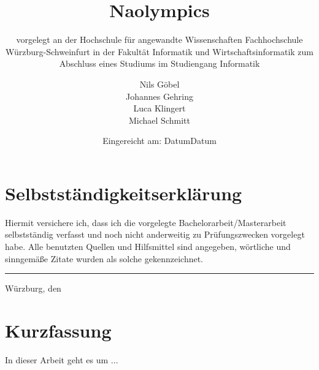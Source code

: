 \documentclass[12pt,a4paper,DIV13,pdftex,BCOR10mm,fleqn,liststotoc,bibtotoc,cleardoubleempty]{scrbook}
\begin{document}
\frontmatter
\titlehead{%
  {Hochschule f\"{u}r angewandte Wissenschaften\\
   Fachhochschule W\"{u}rzburg-Schweinfurt\\
   Fakult\"{a}t Informatik und Wirtschaftsinformatik}}
\subject{Projektarbeit}
\title{Naolympics\\[10mm]}
\subtitle{\normalsize{vorgelegt an der Hochschule f\"{u}r angewandte Wissenschaften Fachhochschule W\"{u}rzburg-Schweinfurt in der Fakult\"{a}t Informatik und Wirtschaftsinformatik zum Abschluss eines Studiums im Studiengang Informatik}}
\author{Nils G\"obel\\Johannes Gehring\\Luca Klingert\\Michael Schmitt}
\date{\normalsize{Eingereicht am: Datum}}
\publishers{
  \normalsize{Erstpr\"{u}fer: Prof. Dr. Arndt Balzer} \\
  \normalsize{Zweitpr\"{u}fer: Prof. Dr. Daniel Kulesz}\\
}


\maketitle

\thispagestyle{empty}
\section*{Selbstst\"{a}ndigkeitserkl\"{a}rung}
Hiermit versichere ich, dass ich die vorgelegte Bachelorarbeit/Masterarbeit selbstst\"{a}ndig verfasst und noch nicht anderweitig zu Pr\"{u}fungszwecken vorgelegt habe. Alle benutzten Quellen und Hilfsmittel sind angegeben, w\"{o}rtliche und sinngem\"{a}{\ss}e Zitate wurden als solche gekennzeichnet.\\[15mm]
\vspace{20mm}
\hrule
\vspace{5mm}
W\"urzburg, den \date{Datum}

\cleardoublepage     %

\thispagestyle{empty}
\section*{Kurzfassung}
In dieser Arbeit geht es um ...
\end{document}
